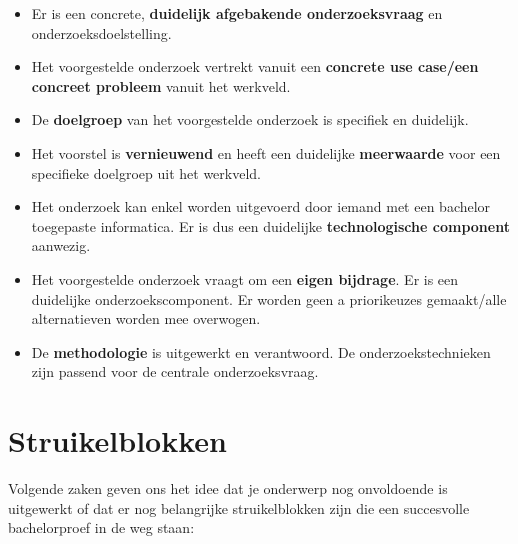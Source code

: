\begin{itemize}
  \item Er is een concrete, \textbf{duidelijk afgebakende onderzoeksvraag} en onderzoeksdoelstelling.
  \item Het voorgestelde onderzoek vertrekt vanuit een \textbf{concrete use case/een concreet probleem} vanuit het werkveld. 
  \item De \textbf{doelgroep} van het voorgestelde onderzoek is specifiek en duidelijk. 
  \item Het voorstel is \textbf{vernieuwend} en heeft een duidelijke \textbf{meerwaarde} voor een specifieke doelgroep uit het werkveld.
  \item Het onderzoek kan enkel worden uitgevoerd door iemand met een bachelor toegepaste informatica. Er is dus een duidelijke \textbf{technologische component} aanwezig.
  \item Het voorgestelde onderzoek vraagt om een \textbf{eigen bijdrage}. Er is een duidelijke onderzoekscomponent. Er worden geen a priorikeuzes gemaakt/alle alternatieven worden mee overwogen. 
  \item De \textbf{methodologie} is uitgewerkt en verantwoord. De onderzoekstechnieken zijn passend voor de centrale onderzoeksvraag. 
\end{itemize}

\section{Struikelblokken}%
\label{sec:onderwerp-struikelblokken}

Volgende zaken geven ons het idee dat je onderwerp nog onvoldoende is uitgewerkt of dat er nog belangrijke struikelblokken zijn die een succesvolle bachelorproef in de weg staan:

